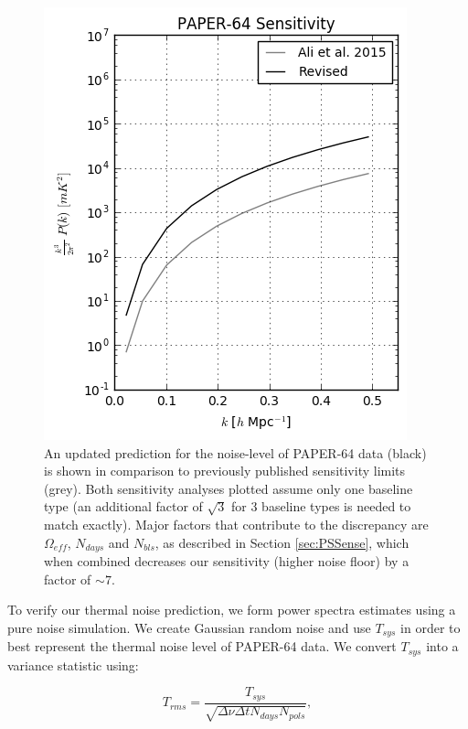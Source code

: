 \documentclass[preprint2,numberedappendix,tighten]{aastex6}  %
\begin{document}
\begin{figure}
	\centering
	\includegraphics[width=\columnwidth]{plots/sense_check.png}
	\caption{An updated prediction for the noise-level of PAPER-64 data (black) is shown in comparison to previously published sensitivity limits (grey). Both sensitivity analyses plotted assume only one baseline type (an additional factor of $\sqrt{3}$ for 3 baseline types is needed to match \citet{ali_et_al2015} exactly). Major factors that contribute to the discrepancy are $\Omega_{eff}$, $N_{days}$ and $N_{bls}$, as described in Section \ref{sec:PSSense}, which when combined decreases our sensitivity (higher noise floor) by a factor of $\sim7$.}
	\label{fig:sense_check}
\end{figure}

To verify our thermal noise prediction, we form power spectra estimates using a pure noise simulation. We create Gaussian random noise and use $T_{sys}$ in order to best represent the thermal noise level of PAPER-64 data. We convert $T_{sys}$ into a variance statistic using:

\begin{equation}
T_{rms} = \frac{T_{sys}}{\sqrt{\Delta\nu \Delta t N_{days} N_{pols}}},
\end{equation}
\end{document}
